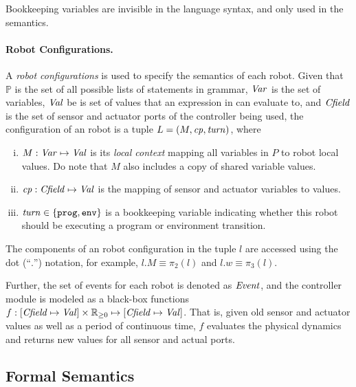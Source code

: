 Bookkeeping variables are invisible in the language syntax, and only used in the semantics.


\paragraph{Robot Configurations.}

A \emph{robot configurations} is used to specify the semantics of each robot.
Given that $\mathbb{P}$ is the set of all possible lists of statements in \lgname grammar,
$\mathit{Var}$ is the set of variables, $\mathit{Val}$ be is set of values that an expression in \lgname can evaluate to,
and $\mathit{Cfield}$ is the set of sensor and actuator ports of the controller being used,
the configuration of an robot is a tuple $L = ({M},\mathit{cp},\mathit{turn})$, where

\begin{enumerate}[i)]
\item ${M} : \mathit{Var} \mapsto \mathit{Val}$ is its \emph{local context} mapping all variables in $P$ to robot local values.
      Do note that $M$ also includes a copy of shared variable values.
\item $\mathit{cp} : \mathit{Cfield} \mapsto \mathit{Val}$ is the mapping of sensor and actuator variables to values.
\item $\mathit{turn} \in \{\mathtt{prog},\mathtt{env}\}$ is a bookkeeping variable indicating whether this robot should be executing a program or environment transition.
\end{enumerate}
The components of an robot configuration in the tuple $l$ are accessed
using the dot (``$.$'') notation, for example, $l.M\equiv \pi_2(l)$ and $l.w \equiv \pi_3(l)$.

Further, the set of events for each robot is denoted as $\mathit{Event}$,
and the controller module is modeled as a black-box functions
$f: [\Cfield \mapsto \Val] \times \nnreals \mapsto [\Cfield \mapsto \Val]$.
That is, given old sensor and actuator values as well as a period of continuous time,
$f$ evaluates the physical dynamics and returns new values for all sensor and actual ports.


\subsection{Formal Semantics}\label{sec:semantics}

\newcommand{\SelectEventRule}{\textsc{SelectEvent}\xspace}
\newcommand{\EndEventRule}{\textsc{EndEvent}\xspace}
\newcommand{\ProgTransRule}{\textsc{ProgTrans}\xspace}
\newcommand{\RobotEnvTransRule}{\textsc{RobotEnvTrans}\xspace}
\newcommand{\EnvTransRule}{\textsc{EnvTrans}\xspace}
\newcommand{\RobotEnvToProgRule}{\textsc{RobotEnvToProg}\xspace}
\newcommand{\EnvToProgRule}{\textsc{EnvToProg}\xspace}
\newcommand{\exprule}{\rightarrow_E\xspace}
\newcommand{\stmtrule}{\rightarrow_\mathit{stmt}\xspace}
\newcommand{\sysrule}{\rightarrow_\mathit{Env}\xspace}
\newcommand{\progtrans}{\rightarrow_\mathit{prog}\xspace}
\newcommand{\envtrans}{\rightarrow_\mathit{env}\xspace}
\newcommand{\SelectEvent}{\ensuremath{\mathtt{\oplus}}\xspace}
\newcommand{\EndEvent}{\ensuremath{\mathtt{\cdot}}\xspace}

